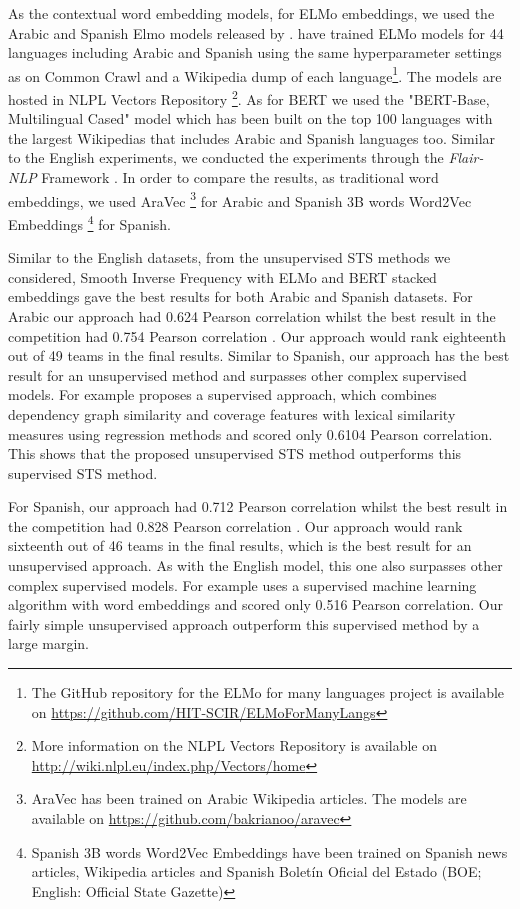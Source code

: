 As the contextual word embedding models, for ELMo embeddings, we used the Arabic and Spanish Elmo models released by \citet{che-EtAl:2018:K18-2}. \citet{che-EtAl:2018:K18-2} have trained ELMo models for 44 languages including Arabic and Spanish using the same hyperparameter settings as \citet{peters-etal-2018-deep} on Common Crawl and a Wikipedia dump of each language\footnote{The GitHub repository for the ELMo for many languages project is available on \url{https://github.com/HIT-SCIR/ELMoForManyLangs}}. The models are hosted in NLPL Vectors Repository \cite{fares-etal-2017-word}\footnote{More information on the NLPL Vectors Repository is available on \url{http://wiki.nlpl.eu/index.php/Vectors/home}}. As for BERT we used the "BERT-Base, Multilingual Cased" model \cite{devlin-etal-2019-bert} which has been built on the top 100 languages with the largest Wikipedias that includes Arabic and Spanish languages too. Similar to the English experiments, we conducted the experiments through the \textit{Flair-NLP} Framework \cite{akbik-etal-2019-flair}. In order to compare the results, as traditional word embeddings,  we used AraVec \cite{SOLIMAN2017256} \footnote{AraVec has been trained on Arabic Wikipedia articles. The models are available on \url{https://github.com/bakrianoo/aravec}} for Arabic and Spanish 3B words Word2Vec Embeddings \cite{doi:10.1177/1550147718811827}\footnote{Spanish 3B words Word2Vec Embeddings have been trained on Spanish news articles, Wikipedia articles and Spanish Boletín Oficial del Estado (BOE; English: Official State Gazette)} for Spanish.

Similar to the English datasets, from the unsupervised STS methods we considered, Smooth Inverse Frequency with ELMo and BERT stacked embeddings gave the best results for both Arabic and Spanish datasets. For Arabic our approach had 0.624 Pearson correlation whilst the best result \cite{wu-etal-2017-bit} in the competition had 0.754 Pearson correlation \cite{cer-etal-2017-semeval}. Our approach would rank eighteenth out of 49 teams in the final results. Similar to Spanish, our approach has the best result for an unsupervised method and surpasses other complex supervised models. For example \citet{kohail-etal-2017-sts} proposes a supervised approach, which combines dependency graph similarity and coverage features with lexical similarity measures using regression methods and scored only 0.6104 Pearson correlation. This shows that the proposed unsupervised STS method outperforms this supervised STS method.


For Spanish, our approach had 0.712 Pearson correlation whilst the best result \cite{tian-etal-2017-ecnu} in the competition had 0.828 Pearson correlation \cite{cer-etal-2017-semeval}. Our approach would rank sixteenth out of 46 teams in the final results, which is the best result for an unsupervised approach. As with the English model, this one also surpasses other complex supervised models. For example \citet{barrow-peskov-2017-umdeep} uses a supervised machine learning algorithm with word embeddings and scored only 0.516 Pearson correlation. Our fairly simple unsupervised approach outperform this supervised method by a large margin. 

